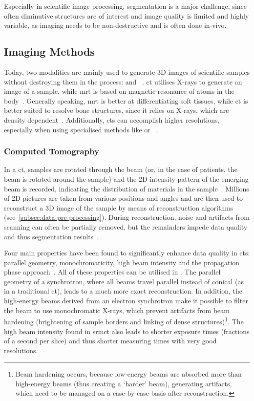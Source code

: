 Especially in scientific image processing, segmentation is a major challenge, since often diminutive structures are of interest and image quality is limited and highly variable, as imaging needs to be non-destructive and is often done in-vivo.


\subsection{Imaging Methods} \label{subsec:3d-imaging-data}
Today, two modalities are mainly used to generate 3D images of scientific samples without destroying them in the process:  and ~\autocite{Ganguly2010}.
\gls{ct} utilises X-rays to generate an image of a sample, while \gls{mrt} is based on magnetic resonance of atoms in the body~\autocite{Pandit2014,Bercovich2018}.
Generally speaking, \gls{mrt} is better at differentiating soft tissues, while \gls{ct} is better suited to resolve bone structures, since it relies on X-rays, which are density dependent~\autocite{Bercovich2018}.
Additionally, \glspl{ct} can accomplish higher resolutions, especially when using specialised methods like  or ~\autocite{Pandit2014}.

\subsubsection{Computed Tomography}\label{subsubsec:computed-tomography}
In a \gls{ct}, samples are rotated through the beam (or, in the case of patients, the beam is rotated around the sample) and the 2D intensity pattern of the emerging beam is recorded, indicating the distribution of materials in the sample~\autocite{Bercovich2018}.
Millions of 2D pictures are taken from various positions and angles and are then used to reconstruct a 3D image of the sample by means of reconstruction algorithms (see~\autoref{subsec:data-pre-processing}).
During reconstruction, noise and artifacts from scanning can often be partially removed, but the remainders impede data quality and thus segmentation results~\autocite{Vidal2005}.

Four main properties have been found to significantly enhance data quality in \glspl{ct}: parallel geometry, monochromaticity, high beam intensity and the propagation phase approach~\autocite{Tafforeau2006}.
All of these properties can be utilised in .
The parallel geometry of a synchrotron, where all beams travel parallel instead of conical (as in a traditional \gls{ct}), leads to a much more exact reconstruction.
In addition, the high-energy beams derived from an electron synchrotron make it possible to filter the beam to use monochromatic X-rays, which prevent artifacts from beam hardening (brightening of sample borders and linking of dense structures)\footnote{Beam hardening occurs, because low-energy beams are absorbed more than high-energy beams (thus creating a ‘harder’ beam), generating artifacts, which need to be managed on a case-by-case basis after reconstruction.}.
The high beam intensity found in \gls{srmct} also leads to shorter exposure times (fractions of a second per slice) and thus shorter measuring times with very good resolutions.~\autocite{Tafforeau2006}

